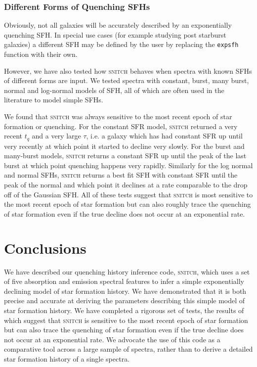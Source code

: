 \documentclass[useAMS,usenatbib]{mn2e}
\begin{document}
\subsubsection{Different Forms of Quenching SFHs}

Obviously, not all galaxies will be accurately described by an exponentially quenching SFH. In special use cases (for example studying post starburst galaxies) a different SFH may be defined by the user by replacing the \texttt{expsfh} function with their own. 

However, we have also tested how \textsc{snitch} behaves when spectra with known SFHs of different forms are input. We tested spectra with  constant, burst, many burst, normal and log-normal models of SFH, all of which are often used in the literature to model simple SFHs. 

We found that \textsc{snitch} was always sensitive to the most recent epoch of star formation or quenching. For the constant SFR model, \textsc{snitch} returned a very recent $t_q$ and a very large $\tau$, i.e. a galaxy which has had constant SFR up until very recently at which point it started to decline very slowly. For the burst and many-burst models, \textsc{snitch} returns a constant SFR up until the peak of the last burst at which point quenching happens very rapidly. Similarly for the log normal and normal SFHs, \textsc{snitch} returns a best fit SFH with constant SFR until the peak of the normal and which point it declines at a rate comparable to the drop off of the Gaussian SFH. All of these tests suggest that \textsc{snitch} is most sensitive to the most recent epoch of star formation but can also roughly trace the quenching of star formation even if the true decline does not occur at an exponential rate. 



\section{Conclusions}

We have described our quenching history inference code, \textsc{snitch}, which uses a set of five absorption and emission spectral features to infer a simple exponentially declining model of star formation history. We have demonstrated that it is both precise and accurate at deriving the parameters describing this simple model of star formation history. We have completed a rigorous set of tests, the results of which suggest that \textsc{snitch} is sensitive to the most recent epoch of star formation but can also trace the quenching of star formation even if the true decline does not occur at an exponential rate.  We advocate the use of this code as a comparative tool across a large sample of spectra, rather than to derive a detailed star formation history of a single spectra. 
\end{document}
